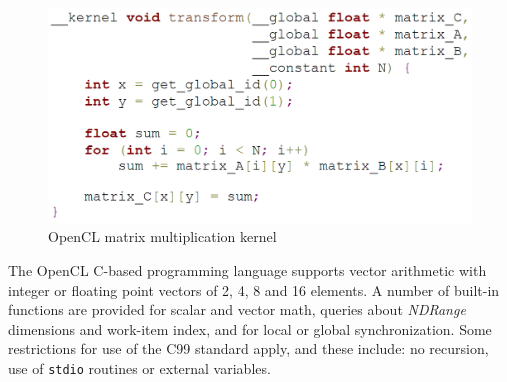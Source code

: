 		\begin{figure}[h]
		\centering
		\includegraphics[height=0.27\textheight]{graphics/opencl_kernel.png}
		\caption{OpenCL matrix multiplication kernel}
		\label{fig:opencl_kernel}
		\end{figure}
	
	The OpenCL C-based programming language supports vector arithmetic with integer or floating point vectors of 2, 4, 8 and 16 elements. A number of built-in functions are provided for scalar and vector math, queries about \textit{NDRange} dimensions and work-item index, and for local or global synchronization. Some restrictions for use of the C99 standard apply, and these include: no recursion, use of \texttt{stdio} routines or external variables.
